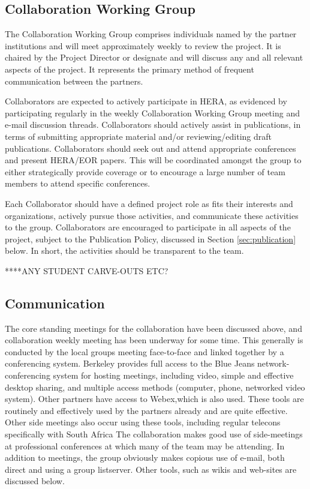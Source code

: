 \documentclass[preprint]{aastex}
\begin{document}
\subsection{Collaboration Working Group}
The Collaboration Working Group comprises individuals named by the partner
institutions and will meet approximately weekly to review the project. It is chaired
by the Project Director or designate and will discuss any and all relevant aspects of
the project. It represents the primary method of frequent communication between the
partners.

Collaborators are expected to actively participate in HERA, as evidenced by participating
regularly in the weekly Collaboration Working Group meeting and e-mail discussion
threads.  Collaborators should actively assist in publications, in terms of submitting
appropriate material and/or reviewing/editing draft publications.  Collaborators should
seek out and attend appropriate conferences and present HERA/EOR papers.  This will
be coordinated amongst the group to either strategically provide coverage or to encourage 
a large number of team members to attend specific conferences.

Each Collaborator should have a defined project role as fits their interests and organizations,
actively pursue those activities, and communicate these activities to the group.  Collaborators
are encouraged to participate in all aspects of the project, subject to the Publication Policy, 
discussed in Section \ref{sec:publication} below.  In short, the activities should be transparent
to the team.

****ANY STUDENT CARVE-OUTS ETC?

\subsection{Communication}
The core standing meetings for the collaboration have been discussed above, and
collaboration weekly meeting has been underway for some time. This generally is
conducted by the local groups meeting face-to-face and linked together by a
conferencing system. Berkeley provides full access to the Blue Jeans
network-conferencing system for hosting meetings, including video, simple and
effective desktop sharing, and multiple access methods (computer, phone, networked
video system). Other partners have access to Webex,which is also used. These tools
are routinely and effectively used by the partners already and are quite effective.
Other side meetings also occur using these tools, including regular telecons
specifically with South Africa The collaboration makes good use of side-meetings at
professional conferences at which many of the team may be attending.
In addition to meetings, the group obviously makes copious use of e-mail, both direct 
and using a group listserver.  Other tools, such as wikis and web-sites are discussed below.
\end{document}
